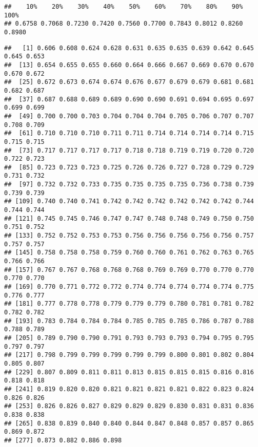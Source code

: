 \documentclass[
]{article}
\newenvironment{Shaded}{\begin{snugshade}}{\end{snugshade}}
\newcommand{\AttributeTok}[1]{\textcolor[rgb]{0.13,0.29,0.53}{#1}}
\newcommand{\DecValTok}[1]{\textcolor[rgb]{0.00,0.00,0.81}{#1}}
\newcommand{\FunctionTok}[1]{\textcolor[rgb]{0.13,0.29,0.53}{\textbf{#1}}}
\newcommand{\NormalTok}[1]{#1}
\newcommand{\SpecialCharTok}[1]{\textcolor[rgb]{0.81,0.36,0.00}{\textbf{#1}}}
\begin{document}
\begin{Shaded}
\end{Shaded}

\begin{verbatim}
##    10%    20%    30%    40%    50%    60%    70%    80%    90%   100% 
## 0.6758 0.7068 0.7230 0.7420 0.7560 0.7700 0.7843 0.8012 0.8260 0.8980
\end{verbatim}

\begin{Shaded}
\end{Shaded}

\begin{verbatim}
##   [1] 0.606 0.608 0.624 0.628 0.631 0.635 0.635 0.639 0.642 0.645 0.645 0.653
##  [13] 0.654 0.655 0.655 0.660 0.664 0.666 0.667 0.669 0.670 0.670 0.670 0.672
##  [25] 0.672 0.673 0.674 0.674 0.676 0.677 0.679 0.679 0.681 0.681 0.682 0.687
##  [37] 0.687 0.688 0.689 0.689 0.690 0.690 0.691 0.694 0.695 0.697 0.699 0.699
##  [49] 0.700 0.700 0.703 0.704 0.704 0.704 0.705 0.706 0.707 0.707 0.708 0.709
##  [61] 0.710 0.710 0.710 0.711 0.711 0.714 0.714 0.714 0.714 0.715 0.715 0.715
##  [73] 0.717 0.717 0.717 0.717 0.718 0.718 0.719 0.719 0.720 0.720 0.722 0.723
##  [85] 0.723 0.723 0.723 0.725 0.726 0.726 0.727 0.728 0.729 0.729 0.731 0.732
##  [97] 0.732 0.732 0.733 0.735 0.735 0.735 0.735 0.736 0.738 0.739 0.739 0.739
## [109] 0.740 0.740 0.741 0.742 0.742 0.742 0.742 0.742 0.742 0.744 0.744 0.744
## [121] 0.745 0.745 0.746 0.747 0.747 0.748 0.748 0.749 0.750 0.750 0.751 0.752
## [133] 0.752 0.752 0.753 0.753 0.756 0.756 0.756 0.756 0.756 0.757 0.757 0.757
## [145] 0.758 0.758 0.758 0.759 0.760 0.760 0.761 0.762 0.763 0.765 0.766 0.766
## [157] 0.767 0.767 0.768 0.768 0.768 0.769 0.769 0.770 0.770 0.770 0.770 0.770
## [169] 0.770 0.771 0.772 0.772 0.774 0.774 0.774 0.774 0.774 0.775 0.776 0.777
## [181] 0.777 0.778 0.778 0.779 0.779 0.779 0.780 0.781 0.781 0.782 0.782 0.782
## [193] 0.783 0.784 0.784 0.784 0.785 0.785 0.785 0.786 0.787 0.788 0.788 0.789
## [205] 0.789 0.790 0.790 0.791 0.793 0.793 0.793 0.794 0.795 0.795 0.797 0.797
## [217] 0.798 0.799 0.799 0.799 0.799 0.799 0.800 0.801 0.802 0.804 0.805 0.807
## [229] 0.807 0.809 0.811 0.811 0.813 0.815 0.815 0.815 0.816 0.816 0.818 0.818
## [241] 0.819 0.820 0.820 0.821 0.821 0.821 0.821 0.822 0.823 0.824 0.826 0.826
## [253] 0.826 0.826 0.827 0.829 0.829 0.829 0.830 0.831 0.831 0.836 0.838 0.838
## [265] 0.838 0.839 0.840 0.840 0.844 0.847 0.848 0.857 0.857 0.865 0.869 0.872
## [277] 0.873 0.882 0.886 0.898
\end{verbatim}
\end{document}
